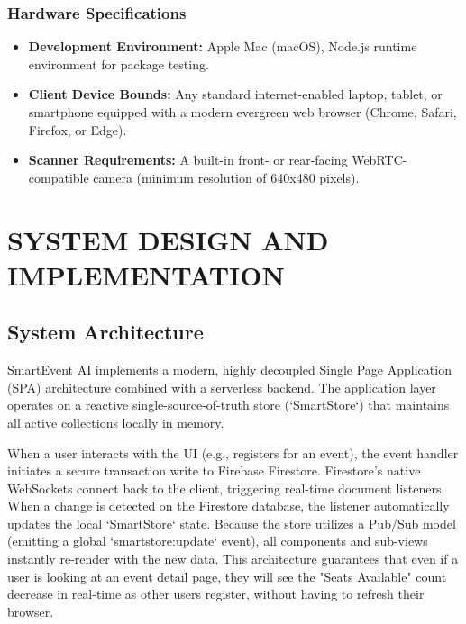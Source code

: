 \documentclass[14pt,a4paper]{extreport}
\begin{document}
\subsection{Hardware Specifications}
\begin{itemize}
    \item \textbf{Development Environment:} Apple Mac (macOS), Node.js runtime environment for package testing.
    \item \textbf{Client Device Bounds:} Any standard internet-enabled laptop, tablet, or smartphone equipped with a modern evergreen web browser (Chrome, Safari, Firefox, or Edge).
    \item \textbf{Scanner Requirements:} A built-in front- or rear-facing WebRTC-compatible camera (minimum resolution of 640x480 pixels).
\end{itemize}

\chapter{SYSTEM DESIGN AND IMPLEMENTATION}
\section{System Architecture}
SmartEvent AI implements a modern, highly decoupled Single Page Application (SPA) architecture combined with a serverless backend. The application layer operates on a reactive single-source-of-truth store (`SmartStore`) that maintains all active collections locally in memory. 

When a user interacts with the UI (e.g., registers for an event), the event handler initiates a secure transaction write to Firebase Firestore. Firestore's native WebSockets connect back to the client, triggering real-time document listeners. When a change is detected on the Firestore database, the listener automatically updates the local `SmartStore` state. Because the store utilizes a Pub/Sub model (emitting a global `smartstore:update` event), all components and sub-views instantly re-render with the new data. This architecture guarantees that even if a user is looking at an event detail page, they will see the "Seats Available" count decrease in real-time as other users register, without having to refresh their browser.
\end{document}

